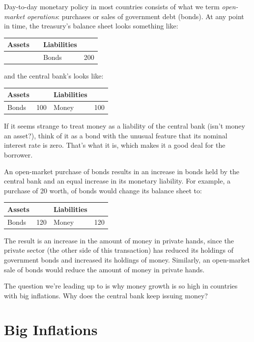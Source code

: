 Day-to-day monetary policy in most countries consists of what we term
{\it open-market operations\/}:  purchases or sales of
government debt (bonds).
At any point in time, the treasury's balance sheet looks
something like:
%
\begin{center}
\begin{tabular}{lr|lr}
Assets\phantom{ities}  &\phantom{100}&  Liabilities \\
\hline
& & Bonds & 200
\end{tabular}
\end{center}
%
and the central bank's looks like:
%
\begin{center}
\begin{tabular}{lr|lr}
Assets\phantom{ities}  &&  Liabilities \\
\hline
Bonds &  100 & Money & 100
\end{tabular}
\end{center}
%
If it seems strange to treat money as a liability of the
central bank (isn't money an asset?),
think of it as a bond with the unusual
feature that its nominal interest rate is zero.
That's what it is, which makes it a good deal for the borrower.

An open-market purchase of bonds results in an increase
in bonds held by the central bank and an equal increase in its
monetary liability.
For example, a purchase of 20 worth, of bonds would change its
balance sheet to:
%
\begin{center}
\begin{tabular}{lr|lr}
Assets\phantom{ities}  &&  Liabilities \\
\hline
Bonds &  120 & Money & 120
\end{tabular}
\end{center}
%
The result is an increase in the amount of money in private hands,
since the private sector (the other side of this transaction)
has reduced its holdings of government bonds
and increased its holdings of money.
Similarly, an open-market sale of bonds would reduce the amount of money in
private hands.

The question we're leading up to is why money growth is so high
in countries with big inflations.
Why does the central bank keep issuing money?


\section{Big Inflations}

